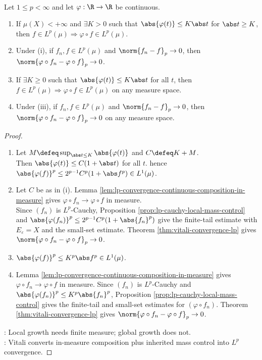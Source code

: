 \begin{theorem} \label{thm:composition-growth-criteria-lp} \\
Let $1\leq p<\infty$ and let $\varphi:\R\to\R$ be continuous.
\begin{enumerate}[label=(\roman*)]
\setlength{\itemsep}{0pt}
\item If $\mu(X)<+\infty$ and $\exists K>0$ such that $\abs{\varphi(t)}\leq K\abs t$ for $\abs t\geq K$, then $f\in L^p(\mu)\Rightarrow\varphi\circ f\in L^p(\mu)$.
\item Under (i), if $f_n,f\in L^p(\mu)$ and $\norm{f_n-f}_p\to0$, then $\norm{\varphi\circ f_n-\varphi\circ f}_p\to0$.
\item If $\exists K\geq0$ such that $\abs{\varphi(t)}\leq K\abs t$ for all $t$, then $f\in L^p(\mu)\Rightarrow\varphi\circ f\in L^p(\mu)$ on any measure space.
\item Under (iii), if $f_n,f\in L^p(\mu)$ and $\norm{f_n-f}_p\to0$, then $\norm{\varphi\circ f_n-\varphi\circ f}_p\to0$ on any measure space.
\end{enumerate}
\begin{proof}
\begin{enumerate}[label=(\roman*)]
\setlength{\itemsep}{0pt}
\item Let $M\defeq\sup_{\abs t\leq K}\abs{\varphi(t)}$ and $C\defeq K+M$.\\
Then $\abs{\varphi(t)}\leq C(1+\abs t)$ for all $t$. hence $\abs{\varphi(f)}^p\leq2^{p-1}C^p(1+\abs f^p)\in L^1(\mu)$.
\item Let $C$ be as in (i). Lemma \ref{lem:lp-convergence-continuous-composition-in-measure} gives $\varphi\circ f_n\to\varphi\circ f$ in measure.\\
Since $(f_n)$ is $L^p$-Cauchy, Proposition \ref{prop:lp-cauchy-local-mass-control} and $\abs{\varphi(f_n)}^p\leq2^{p-1}C^p(1+\abs{f_n}^p)$ give the finite-tail estimate with $E_\varepsilon=X$ and the small-set estimate. Theorem \ref{thm:vitali-convergence-lp} gives $\norm{\varphi\circ f_n-\varphi\circ f}_p\to0$.
\item $\abs{\varphi(f)}^p\leq K^p\abs f^p\in L^1(\mu)$.
\item Lemma \ref{lem:lp-convergence-continuous-composition-in-measure} gives $\varphi\circ f_n\to\varphi\circ f$ in measure. Since $(f_n)$ is $L^p$-Cauchy and $\abs{\varphi(f_n)}^p\leq K^p\abs{f_n}^p$, Proposition \ref{prop:lp-cauchy-local-mass-control} gives the finite-tail and small-set estimates for $(\varphi\circ f_n)$. Theorem \ref{thm:vitali-convergence-lp} gives $\norm{\varphi\circ f_n-\varphi\circ f}_p\to0$.
\end{enumerate}
: Local growth needs finite measure; global growth does not.\\
: Vitali converts in-measure composition plus inherited mass control into $L^p$ convergence.
\end{proof}
\end{theorem}

